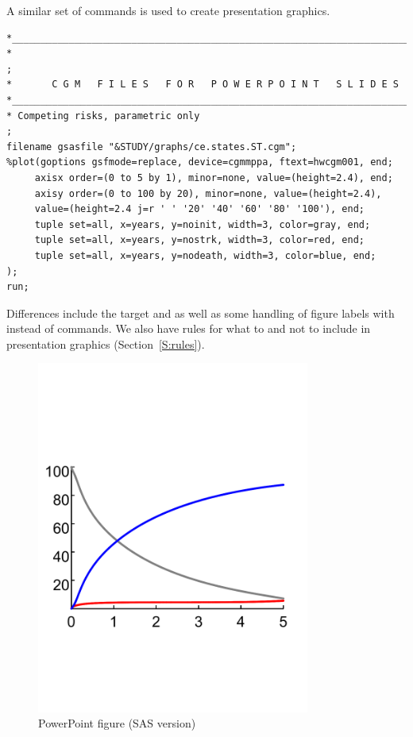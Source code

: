 \documentclass[nojss]{jss}\usepackage[]{graphicx}\usepackage[]{color}
\begin{document}
A similar set of  commands is used to create presentation graphics.
\begin{lstlisting}[float,floatplacement=!htpb, caption={plot.sas commands: CGM instructions.}, label={plot.sas:cgm}]
*____________________________________________________________________________;
*                                                                            ;
*       C G M   F I L E S   F O R   P O W E R P O I N T   S L I D E S
*____________________________________________________________________________;
* Competing risks, parametric only                                           ;
filename gsasfile "&STUDY/graphs/ce.states.ST.cgm";
%plot(goptions gsfmode=replace, device=cgmmppa, ftext=hwcgm001, end;
     axisx order=(0 to 5 by 1), minor=none, value=(height=2.4), end;
     axisy order=(0 to 100 by 20), minor=none, value=(height=2.4), 
     value=(height=2.4 j=r ' ' '20' '40' '60' '80' '100'), end;
     tuple set=all, x=years, y=noinit, width=3, color=gray, end;
     tuple set=all, x=years, y=nostrk, width=3, color=red, end;
     tuple set=all, x=years, y=nodeath, width=3, color=blue, end;
);
run;  
\end{lstlisting}
Differences include the target  and  as well as some handling of figure labels with  instead of  commands. We also have rules for what to and not to include in presentation graphics (Section~\ref{S:rules}).

\begin{figure}[!htpb]
\centering
\includegraphics[width=0.8\textwidth]{../inst/ceStatesST_ppt.pdf}
\caption{PowerPoint figure (SAS version)}
\label{F:sasPowerPoint}
\end{figure}
\end{document}
